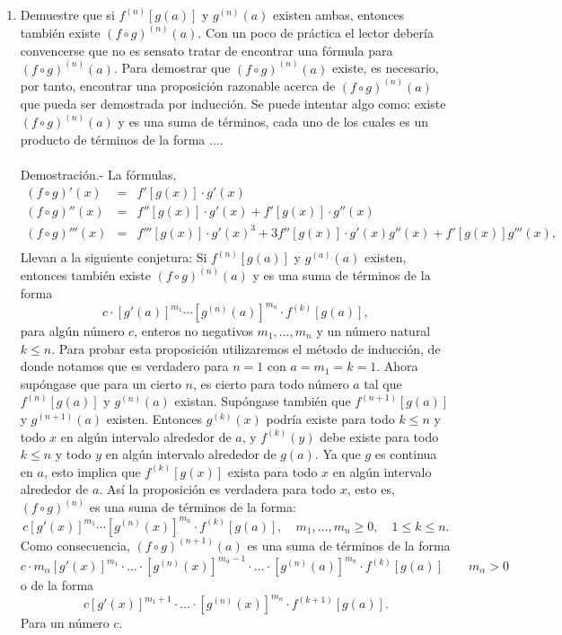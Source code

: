 \begin{enumerate}[\bfseries 1.]
     \item Demuestre que si $f^{(n)}\left[g(a)\right]$ y $g^{(n)}(a)$ existen ambas, entonces también existe $(f\circ g)^{(n)}(a)$. Con un poco de práctica el lector debería convencerse que no es sensato tratar de encontrar una fórmula para $(f \circ g)^{(n)}(a)$. Para demostrar que $(f \circ g)^{(n)}(a)$ existe, es necesario, por tanto, encontrar una proposición razonable acerca de $(f \circ g)^{(n)}(a)$ que pueda ser demostrada por inducción. Se puede intentar algo como: existe $(f \circ g)^{(n)}(a)$ y es una suma de términos, cada uno de los cuales es un producto de términos de la forma $\ldots$.\\\\ 
	 Demostración.-\; La fórmulas,
	 $$\begin{array}{rcl}
	     (f\circ g)'(x) &=& f'\left[g(x)\right]\cdot g'(x)\\
	     (f\circ g)''(x) &=& f''\left[g(x)\right] \cdot g'(x) + f'\left[g(x)\right]\cdot g''(x)\\
	     (f\circ g)'''(x) &=& f'''\left[g(x)\right]\cdot g'(x)^3 + 3f''\left[g(x)\right]\cdot g'(x)g''(x)+f'\left[g(x)\right]g'''(x),\\
	 \end{array}$$
	 Llevan a la siguiente conjetura: Si $f^{(n)}\left[g(a)\right]$ y $g^{(a)}(a)$ existen, entonces también existe $(f\circ g)^{(n)}(a)$ y es una suma de términos de la forma
	 $$c\cdot \left[g'(a)\right]^{m_1}\cdots \left[g^{(n)}(a)\right]^{m_n}\cdot f^{(k)}\left[g(a)\right],$$
	 para algún número $c$, enteros no negativos $m_1,\ldots , m_n$ y un número natural $k\leq n$. Para probar esta proposición utilizaremos el método de inducción, de donde notamos que es verdadero para $n=1$ con $a=m_1=k=1$. Ahora supóngase que para un cierto $n$, es cierto para todo número $a$ tal que $f^{(n)}\left[g(a)\right]$ y $g^{(n)}(a)$ existan. Supóngase también que $f^{(n+1)}\left[g(a)\right]$ y $g^{(n+1)}(a)$ existen. Entonces $g^{(k)}(x)$ podría existe para todo $k\leq n$ y todo $x$ en algún intervalo alrededor de $a$, y $f^{(k)}(y)$  debe existe para todo $k\leq n$ y todo $y$ en algún intervalo alrededor de $g(a)$. Ya que $g$ es continua en $a$, esto implica que $f^{(k)}\left[g(x)\right]$ exista para todo $x$ en algún intervalo alrededor de $a$. Así la proposición es verdadera para todo $x$, esto es, $(f\circ g)^{(n)}$ es una suma de términos de la forma:
	 $$c\left[g'(x)\right]^{m_1}\cdots \left[g^{(n)}(x)\right]^{m_n}\cdot f^{(k)}\left[g(a)\right],\quad m_1,\ldots, m_n \geq 0,\quad 1\leq k \leq n.$$
	 Como consecuencia, $(f\circ g)^{(n+1)}(a)$ es una suma de términos de la forma
	 $$c\cdot m_\alpha \left[g'(x)\right]^{m_1}\cdot \ldots \cdot\left[g^{(n)}(x)\right]^{m_\alpha - 1}\cdot \ldots \cdot\left[g^{(n)}(a)\right]^{m_n}\cdot f^{(k)}\left[g(a)\right]\qquad m_\alpha>0$$
	 o de la forma
	 $$c\left[g'(x)\right]^{m_1+1} \cdot \ldots \cdot\left[g^{(n)}(x)\right]^{m_n}\cdot f^{(k+1)}\left[g(a)\right].$$
	 Para un número $c$.\\\\


\end{enumerate}
